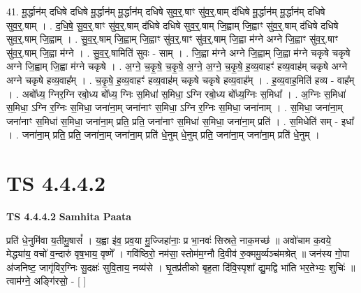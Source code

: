 \documentclass[17pt]{extarticle}
\begin{document}
41. मू॒र्द्धान॑म् दधिषे दधिषे मू॒र्द्धान॑म् मू॒र्द्धान॑म् दधिषे सुव॒र्॒.षाꣳ सु॑व॒र्॒.षाम् द॑धिषे मू॒र्द्धान॑म् मू॒र्द्धान॑म् दधिषे सुव॒र्॒.षाम् । . द॒धि॒षे॒ सु॒व॒र्॒.षाꣳ सु॑व॒र्॒.षाम् द॑धिषे दधिषे सुव॒र्॒.षाम् जि॒ह्वाम् जि॒ह्वाꣳ सु॑व॒र्॒.षाम् द॑धिषे दधिषे सुव॒र्॒.षाम् जि॒ह्वाम् । . सु॒व॒र्॒.षाम् जि॒ह्वाम् जि॒ह्वाꣳ सु॑व॒र्॒.षाꣳ सु॑व॒र्॒.षाम् जि॒ह्वा म॑ग्ने अग्ने जि॒ह्वाꣳ सु॑व॒र्॒.षाꣳ सु॑व॒र्॒.षाम् जि॒ह्वा म॑ग्ने । . सु॒व॒र्॒.षामिति॑ सुवः - साम् । . जि॒ह्वा म॑ग्ने अग्ने जि॒ह्वाम् जि॒ह्वा म॑ग्ने चकृषे चकृषे अग्ने जि॒ह्वाम् जि॒ह्वा म॑ग्ने चकृषे । . अ॒ग्ने॒ च॒कृ॒षे॒ च॒कृ॒षे॒ अ॒ग्ने॒ अ॒ग्ने॒ च॒कृ॒षे॒ ह॒व्य॒वाहꣳ॑ हव्य॒वाह॑म् 
चकृषे अग्ने अग्ने चकृषे हव्य॒वाह᳚म् । . च॒कृ॒षे॒ ह॒व्य॒वाहꣳ॑ हव्य॒वाह॑म् चकृषे चकृषे हव्य॒वाह᳚म् । . ह॒व्य॒वाह॒मिति॑ हव्य - वाह᳚म् । . अबो᳚ध्य॒ ग्निर॒ग्नि रबो॒ध्य बो᳚ध्य॒ ग्निः स॒मिधा॑ स॒मिधा॒ ऽग्नि रबो॒ध्य बो᳚ध्य॒ग्निः स॒मिधा᳚ । . अ॒ग्निः स॒मिधा॑ स॒मिधा॒ ऽग्नि र॒ग्निः स॒मिधा॒ जना॑ना॒म् जना॑नाꣳ स॒मिधा॒ ऽग्नि र॒ग्निः स॒मिधा॒ जना॑नाम् । . स॒मिधा॒ जना॑ना॒म् जना॑नाꣳ स॒मिधा॑ स॒मिधा॒ जना॑ना॒म् प्रति॒ प्रति॒ जना॑नाꣳ स॒मिधा॑ स॒मिधा॒ जना॑ना॒म् प्रति॑ । . स॒मिधेति॑ सम् - इधा᳚ । . जना॑ना॒म् प्रति॒ प्रति॒ जना॑ना॒म् जना॑ना॒म् प्रति॑ धे॒नुम् धे॒नुम् प्रति॒ जना॑ना॒म् जना॑ना॒म् प्रति॑ धे॒नुम् । \newline
\pagebreak
{}

\section{ TS 4.4.4.2 }

\textbf{TS 4.4.4.2 } \newline
\textbf{Samhita Paata} \newline

प्रति॑ धे॒नुमि॑वा य॒तीमु॒षासं᳚ । य॒ह्वा इ॑व॒ प्रव॒या मु॒ज्जिहा॑नाः॒ प्र भा॒नवः॑ सिस्रते॒ नाक॒मच्छ॑ ॥ अवो॑चाम क॒वये॒ मेद्ध्या॑य॒ वचो॑ व॒न्दारु॑ वृष॒भाय॒ वृष्णे᳚ । गवि॑ष्ठिरो॒ नम॑सा॒ स्तोम॑म॒ग्नौ दि॒वीव॑ रु॒क्ममु॒र्व्यञ्च॑मश्रेत् ॥ जन॑स्य गो॒पा अ॑जनिष्ट॒ जागृ॑विर॒ग्निः सु॒दक्षः॑ सुवि॒ताय॒ नव्य॑से । घृ॒तप्र॑तीको बृह॒ता दि॑वि॒स्पृशा᳚ द्यु॒मद्वि भा॑ति भर॒तेभ्यः॒ शुचिः॑ ॥ त्वाम॑ग्ने॒ अङ्गि॑रसो॒ - [  ] \newline
\end{document}
